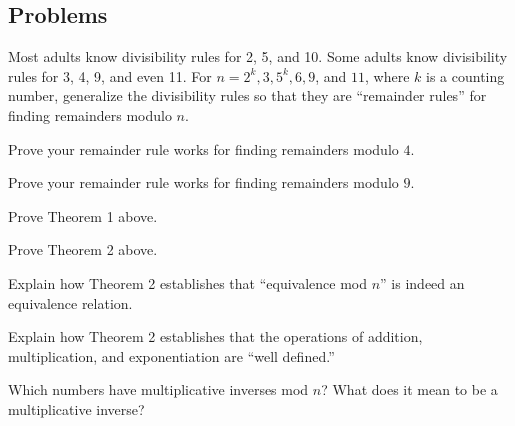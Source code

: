 \documentclass[space,nooutcomes]{ximera}
\begin{document}
\subsection*{Problems}

\begin{problem}
Most adults know divisibility rules for 2, 5, and 10.  Some adults know divisibility rules for 3, 4, 9, and even 11.  For $n = 2^k, 3, 5^k, 6, 9$, and $11$, where $k$ is a counting number, generalize the divisibility rules so that they are ``remainder rules'' for finding remainders modulo $n$.
\end{problem}

\begin{problem}
Prove your remainder rule works for finding remainders modulo $4$.  
\end{problem}

\begin{problem}
Prove your remainder rule works for finding remainders modulo $9$.  
\end{problem}

\begin{problem}
Prove Theorem 1 above.
\end{problem}

\begin{problem}
Prove Theorem 2 above. 
\end{problem}

\begin{problem}
Explain how Theorem 2 establishes that ``equivalence mod $n$'' is indeed an equivalence relation. 
\end{problem}

\begin{problem}
Explain how Theorem 2 establishes that the operations of addition, multiplication, and exponentiation are ``well defined.''
\end{problem}

\begin{problem}
Which numbers have multiplicative inverses mod $n$?  What does it mean to be a multiplicative inverse?  
\end{problem}
\end{document}
